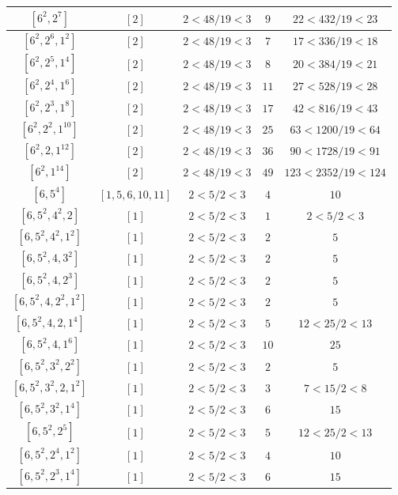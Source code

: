 \documentclass{article}%
\begin{document}
\begin{center}
\begin{longtable}{||c|c|c|c|c||}
$[6^{2}, 2^{7}]$ & $[2]$ & $2 < 48/19 < 3$ & $9$ & $22 < 432/19 < 23$ \\ \hline 
$[6^{2}, 2^{6}, 1^{2}]$ & $[2]$ & $2 < 48/19 < 3$ & $7$ & $17 < 336/19 < 18$ \\ \hline 
$[6^{2}, 2^{5}, 1^{4}]$ & $[2]$ & $2 < 48/19 < 3$ & $8$ & $20 < 384/19 < 21$ \\ \hline 
$[6^{2}, 2^{4}, 1^{6}]$ & $[2]$ & $2 < 48/19 < 3$ & $11$ & $27 < 528/19 < 28$ \\ \hline 
$[6^{2}, 2^{3}, 1^{8}]$ & $[2]$ & $2 < 48/19 < 3$ & $17$ & $42 < 816/19 < 43$ \\ \hline 
$[6^{2}, 2^{2}, 1^{10}]$ & $[2]$ & $2 < 48/19 < 3$ & $25$ & $63 < 1200/19 < 64$ \\ \hline 
$[6^{2}, 2, 1^{12}]$ & $[2]$ & $2 < 48/19 < 3$ & $36$ & $90 < 1728/19 < 91$ \\ \hline 
$[6^{2}, 1^{14}]$ & $[2]$ & $2 < 48/19 < 3$ & $49$ & $123 < 2352/19 < 124$ \\ \hline 
$[6, 5^{4}]$ & $[1, 5, 6, 10, 11]$ & $2 < 5/2 < 3$ & $4$ & $10$ \\ \hline 
$[6, 5^{2}, 4^{2}, 2]$ & $[1]$ & $2 < 5/2 < 3$ & $1$ & $2 < 5/2 < 3$ \\ \hline 
$[6, 5^{2}, 4^{2}, 1^{2}]$ & $[1]$ & $2 < 5/2 < 3$ & $2$ & $5$ \\ \hline 
$[6, 5^{2}, 4, 3^{2}]$ & $[1]$ & $2 < 5/2 < 3$ & $2$ & $5$ \\ \hline 
$[6, 5^{2}, 4, 2^{3}]$ & $[1]$ & $2 < 5/2 < 3$ & $2$ & $5$ \\ \hline 
$[6, 5^{2}, 4, 2^{2}, 1^{2}]$ & $[1]$ & $2 < 5/2 < 3$ & $2$ & $5$ \\ \hline 
$[6, 5^{2}, 4, 2, 1^{4}]$ & $[1]$ & $2 < 5/2 < 3$ & $5$ & $12 < 25/2 < 13$ \\ \hline 
$[6, 5^{2}, 4, 1^{6}]$ & $[1]$ & $2 < 5/2 < 3$ & $10$ & $25$ \\ \hline 
$[6, 5^{2}, 3^{2}, 2^{2}]$ & $[1]$ & $2 < 5/2 < 3$ & $2$ & $5$ \\ \hline 
$[6, 5^{2}, 3^{2}, 2, 1^{2}]$ & $[1]$ & $2 < 5/2 < 3$ & $3$ & $7 < 15/2 < 8$ \\ \hline 
$[6, 5^{2}, 3^{2}, 1^{4}]$ & $[1]$ & $2 < 5/2 < 3$ & $6$ & $15$ \\ \hline 
$[6, 5^{2}, 2^{5}]$ & $[1]$ & $2 < 5/2 < 3$ & $5$ & $12 < 25/2 < 13$ \\ \hline 
$[6, 5^{2}, 2^{4}, 1^{2}]$ & $[1]$ & $2 < 5/2 < 3$ & $4$ & $10$ \\ \hline 
$[6, 5^{2}, 2^{3}, 1^{4}]$ & $[1]$ & $2 < 5/2 < 3$ & $6$ & $15$ \\ \hline 

\end{longtable}
\end{center}
\end{document}
